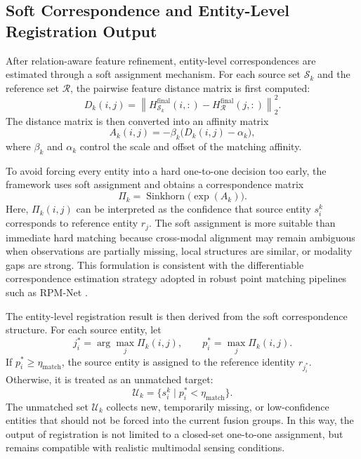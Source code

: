 \subsection{Soft Correspondence and Entity-Level Registration Output}
After relation-aware feature refinement, entity-level correspondences are estimated through a soft assignment mechanism. For each source set \(\mathcal{S}_k\) and the reference set \(\mathcal{R}\), the pairwise feature distance matrix is first computed:
\begin{equation}
  D_k(i,j)
  =
  \left\lVert
    H^{\mathrm{final}}_{\mathcal{S}_k}(i,:)
    -
    H^{\mathrm{final}}_{\mathcal{R}}(j,:)
  \right\rVert_2^2 .
\end{equation}
The distance matrix is then converted into an affinity matrix
\begin{equation}
  A_k(i,j) = -\beta_k \big(D_k(i,j)-\alpha_k\big),
\end{equation}
where \(\beta_k\) and \(\alpha_k\) control the scale and offset of the matching affinity.

To avoid forcing every entity into a hard one-to-one decision too early, the framework uses soft assignment and obtains a correspondence matrix
\begin{equation}
  \Pi_k = \operatorname{Sinkhorn}\big(\exp(A_k)\big).
\end{equation}
Here, \(\Pi_k(i,j)\) can be interpreted as the confidence that source entity \(s^k_i\) corresponds to reference entity \(r_j\). The soft assignment is more suitable than immediate hard matching because cross-modal alignment may remain ambiguous when observations are partially missing, local structures are similar, or modality gaps are strong. This formulation is consistent with the differentiable correspondence estimation strategy adopted in robust point matching pipelines such as RPM-Net \cite{yew2020rpmnet}.

The entity-level registration result is then derived from the soft correspondence structure. For each source entity, let
\begin{equation}
  j_i^{\ast} = \arg\max_j \Pi_k(i,j), \qquad
  p_i^{\ast} = \max_j \Pi_k(i,j).
\end{equation}
If \(p_i^{\ast} \ge \eta_{\mathrm{match}}\), the source entity is assigned to the reference identity \(r_{j_i^{\ast}}\). Otherwise, it is treated as an unmatched target:
\begin{equation}
  \mathcal{U}_k = \{s_i^k \mid p_i^{\ast} < \eta_{\mathrm{match}}\}.
\end{equation}
The unmatched set \(\mathcal{U}_k\) collects new, temporarily missing, or low-confidence entities that should not be forced into the current fusion groups. In this way, the output of registration is not limited to a closed-set one-to-one assignment, but remains compatible with realistic multimodal sensing conditions.


